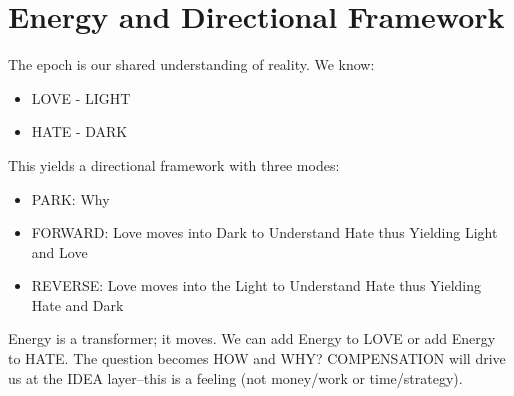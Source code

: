 ﻿\section{Energy and Directional Framework}

The epoch is our shared understanding of reality. We know:

\begin{itemize}
    \item LOVE - LIGHT
    \item HATE - DARK
\end{itemize}

This yields a directional framework with three modes:

\begin{itemize}
    \item PARK: Why
    \item FORWARD: Love moves into Dark to Understand Hate thus Yielding Light and Love
    \item REVERSE: Love moves into the Light to Understand Hate thus Yielding Hate and Dark
\end{itemize}

Energy is a transformer; it moves. We can add Energy to LOVE or add Energy to HATE. The question becomes HOW and WHY? COMPENSATION will drive us at the IDEA layer--this is a feeling (not money/work or time/strategy).